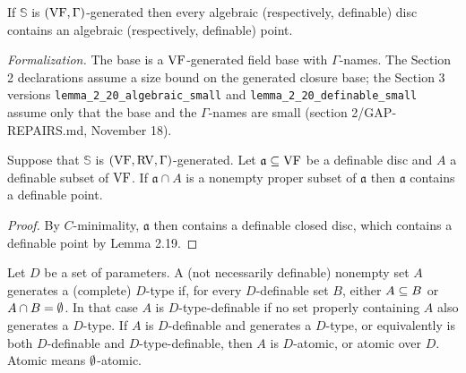 \setcounter{theorem}{19}
\begin{lemma}
\label{algebraic-balls-definable-centers}
\leanok
{}
If $\mathbb{S}$ is $(\mathrm{VF}, \Gamma)$-generated then every algebraic (respectively, definable) disc contains an algebraic (respectively, definable) point.

\emph{Formalization.} The base is a $\mathrm{VF}$-generated field base with $\Gamma$-names. The Section 2 declarations assume a size bound on the generated closure base; the Section 3 versions \texttt{lemma\_2\_20\_algebraic\_small} and \texttt{lemma\_2\_20\_definable\_small} assume only that the base and the $\Gamma$-names are small (section 2/GAP-REPAIRS.md, November 18).
\end{lemma}

\setcounter{theorem}{20}
\begin{corollary}
\label{open-disc-def-point}
\leanok
{}
Suppose that $\mathbb{S}$ is $(\mathrm{VF}, \mathrm{RV}, \Gamma)$-generated. Let $\mathfrak{a} \subseteq \mathrm{VF}$ be a definable disc and $A$ a definable subset of $\mathrm{VF}$. If $\mathfrak{a} \cap A$ is a nonempty proper subset of $\mathfrak{a}$ then $\mathfrak{a}$ contains a definable point.
\end{corollary}

\begin{proof}
\leanok
By $C$-minimality, $\mathfrak{a}$ then contains a definable closed disc, which contains a definable point by Lemma 2.19.
\end{proof}

\setcounter{theorem}{21}
\begin{definition}
\label{s2-atomic}
\leanok
Let $D$ be a set of parameters. A (not necessarily definable) nonempty set $A$ generates a (complete) $D$-type if, for every $D$-definable set $B$, either $A \subseteq B$ or $A \cap B = \emptyset$. In that case $A$ is $D$-type-definable if no set properly containing $A$ also generates a $D$-type. If $A$ is $D$-definable and generates a $D$-type, or equivalently is both $D$-definable and $D$-type-definable, then $A$ is $D$-atomic, or atomic over $D$. Atomic means $\emptyset$-atomic.
\end{definition}

